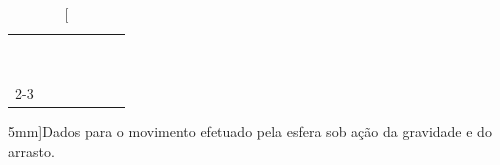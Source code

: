 \begin{table}[!h]
\begin{tabular}{lp{25mm}p{25mm}lp{25mm}p{25mm}l}
	& \cellcolor[gray]{0.95} & \cellcolor[gray]{0.97} && \cellcolor[gray]{0.95} & \cellcolor[gray]{0.97} \\
	& \cellcolor[gray]{0.89} & \cellcolor[gray]{0.92} && \cellcolor[gray]{0.89} & \cellcolor[gray]{0.92}\\
	& \cellcolor[gray]{0.95} & \cellcolor[gray]{0.97} && \cellcolor[gray]{0.95} & \cellcolor[gray]{0.97} \\
	& \cellcolor[gray]{0.89} & \cellcolor[gray]{0.92} && \cellcolor[gray]{0.89} & \cellcolor[gray]{0.92}\\
	& \cellcolor[gray]{0.95} & \cellcolor[gray]{0.97} && \cellcolor[gray]{0.95} & \cellcolor[gray]{0.97} \\
	& \cellcolor[gray]{0.89} & \cellcolor[gray]{0.92} && \cellcolor[gray]{0.89} & \cellcolor[gray]{0.92}\\
	& \cellcolor[gray]{0.95} & \cellcolor[gray]{0.97} && \cellcolor[gray]{0.95} & \cellcolor[gray]{0.97} \\
	& \cellcolor[gray]{0.89} & \cellcolor[gray]{0.92} && \cellcolor[gray]{0.89} & \cellcolor[gray]{0.92}\\
	& \cellcolor[gray]{0.95} & \cellcolor[gray]{0.97} && \cellcolor[gray]{0.95} & \cellcolor[gray]{0.97} \\
	\cmidrule{2-3} \cmidrule{5-6}
\bottomrule
\end{tabular}
\caption[][5mm]{Dados para o movimento efetuado pela esfera sob ação da gravidade e do arrasto.}
\label{TabelaDados}
\end{table}

